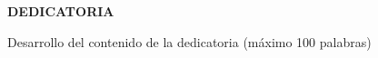 \thispagestyle{empty} %
\begin{flushright}
	
	\medspace
	\vspace{1.5cm}
	
	\textbf{\large DEDICATORIA}\\
	
	\vspace{1cm}
	
	Desarrollo del contenido de la dedicatoria (máximo 100 palabras)
	
\end{flushright}
